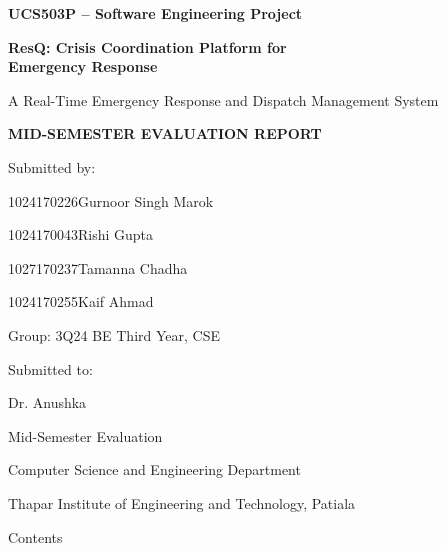 \documentclass[11pt,a4paper]{article}
\begin{document}
\thispagestyle{empty}
\vspace*{0.65in}
\begin{center}
{\fontsize{18}{22}\selectfont\bfseries UCS503P -- Software Engineering Project\par}
\vspace{0.22in}
{\fontsize{25}{30}\selectfont\bfseries ResQ: Crisis Coordination Platform for\\
Emergency Response\par}
\vspace{0.14in}
{\fontsize{14}{17}\selectfont A Real-Time Emergency Response and Dispatch Management System\par}

\vspace{0.45in}
{\fontsize{14}{17}\selectfont\bfseries MID-SEMESTER EVALUATION REPORT\par}

\vspace{0.30in}
{\fontsize{12}{15}\selectfont
Submitted by:\par
\vspace{0.08in}
1024170226\quad Gurnoor Singh Marok\par
1024170043\quad Rishi Gupta\par
1027170237\quad Tamanna Chadha\par
1024170255\quad Kaif Ahmad\par
\vspace{0.08in}
Group: 3Q24 BE Third Year, CSE\par
\vspace{0.25in}
Submitted to:\par
Dr. Anushka\par
Mid-Semester Evaluation\par
Computer Science and Engineering Department\par
Thapar Institute of Engineering and Technology, Patiala\par
}
\end{center}

\newpage

\thispagestyle{empty}
{\fontsize{22}{26}\selectfont Contents\par}
\vspace{8pt}
\end{document}
